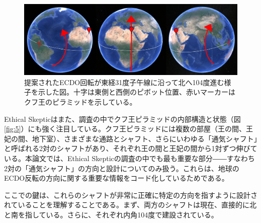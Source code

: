 \documentclass[10pt,twocolumn,letterpaper]{article}
\begin{document}

\begin{figure}[b]
\begin{center}
\includegraphics[width=1\textwidth]{drawing.jpg}
\end{center}
   \caption{提案されたECDO回転が東経31度子午線に沿って北へ104度進む様子を示した図。十字は東側と西側のピボット位置、赤いマーカーはクフ王のピラミッドを示している。}
\label{fig:6}
\end{figure}
Ethical Skepticはまた、調査の中でクフ王ピラミッドの内部構造と状態（図\ref{fig:5}）にも強く注目している\cite{28}。クフ王ピラミッドには複数の部屋（王の間、王妃の間、地下室）、さまざまな通路とシャフト、さらにいわゆる「通気シャフト」と呼ばれる2対のシャフトがあり、それぞれ王の間と王妃の間から1対ずつ伸びている\cite{29,30}。本論文では、Ethical Skepticの調査の中でも最も重要な部分――すなわち2対の「通気シャフト」の方向と設計についてのみ扱う。これらは、地球のECDO反転の方向に関する重要な情報をコード化しているためである。


ここでの鍵は、これらのシャフトが非常に正確に特定の方向を指すように設計されていることを理解することである。まず、両方のシャフトは現在、直接的に北と南を指している。さらに、それぞれ内角104度で建設されている。
\end{document}
